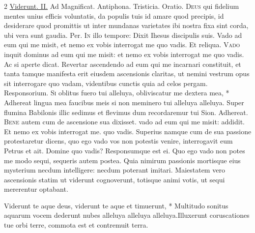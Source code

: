 \begin{multicols*}{2}
 \R \hyperlink{viderunt-te}{Viderunt. II.} {\color{Red} Ad Magnificat. Antiphona.} Tristicia. {\color{Red} Oratio.}
\lettrine[lines=2]{\zallmancaps \color{Blue} D}{eus} qui fidelium mentes unius efficis voluntatis, da populis tuis id amare quod precipis, id desiderare quod promittis ut inter mundanas varietates ibi nostra fixa sint corda, ubi vera sunt gaudia. Per.
\lettrine[lines=2]{\zallmancaps \color{Red} I}{n} illo tempore: Dixit Ihesus discipulis suis. Vado ad eum qui me misit, et nemo ex vobis interrogat me quo vadis. Et reliqua.
\lettrine[lines=2]{\zallmancaps \color{Blue} V}{ado} inquit dominus ad eum qui me misit: et nemo ex vobis interrogat me quo vadis. Ac si aperte dicat. Revertar ascendendo ad eum qui me incarnari constituit, et tanta tamque manifesta erit eiusdem ascensionis claritas, ut nemini vestrum opus sit interrogare quo vadam, videntibus cunctis quia ad celos pergam. {\color{Red} Responsorium.}
\lettrine[lines=2]{\zallmancaps \color{Red} S}{i} \hypertarget{si-oblitus}{\label{si-oblitus}} oblitus fuero tui alleluya, obliviscatur me dextera mea, * Adhereat lingua mea faucibus meis si non meminero tui alleluya alleluya. \V Super flumina Babilonis illic sedimus et flevimus dum recordaremur tui Sion. Adhereat.
\lettrine[lines=2]{\zallmancaps \color{Blue} B}{ene} autem cum de ascensione sua dixisset. vado ad eum qui me misit: addidit. Et nemo ex vobis interrogat me. quo vadis. Superius namque cum de sua passione protestaretur dicens, quo ego vado vos non potestis venire, interrogavit eum Petrus et ait. Domine quo vadis? Responsumque est ei. Quo ego vado non potes me modo sequi, sequeris autem postea. Quia nimirum passionis mortisque eius mysterium necdum intelligere: necdum poterant imitari. Maiestatem vero ascensionis statim ut viderunt cognoverunt, totisque animi votis, ut sequi mererentur optabant.
\begin{responsory}[viderunt-te]
{Viderunt te aque deus, viderunt te aque et timuerunt, * Multitudo sonitus aquarum vocem dederunt nubes alleluya alleluya alleluya.}{Illuxerunt coruscationes tue orbi terre, commota est et contremuit terra.}
\end{responsory}%

\end{multicols*}
